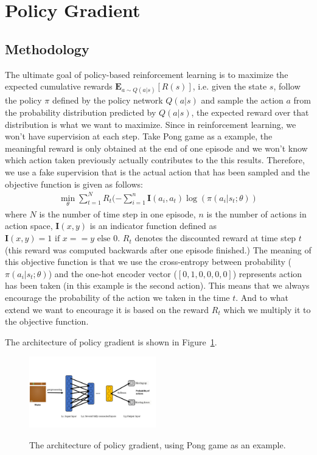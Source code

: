\section{Policy Gradient}
\subsection{Methodology}
The ultimate goal of policy-based reinforcement learning is to maximize the 
expected cumulative rewards $\textbf{E}_{a \sim Q(a|s)}[R(s)]$, i.e. given 
the state $s$, follow the policy $\pi$ defined by the policy network $Q(a|s)$ and
sample the action $a$ from the probability distribution predicted by $Q(a|s)$, the 
expected reward over that distribution is what we want to maximize. Since in 
reinforcement learning, we won't have supervision at each step. Take Pong game 
as a example, the meaningful reward is only obtained at the end of one episode
and we won't know which action taken previously actually contributes to the 
this results. Therefore, we use a fake supervision that is the actual action 
that has been sampled and the objective function is given as follows:
\begin{equation*}
\begin{split}
\min_{\theta}\sum_{t=1}^N R_t (-\sum_{i=1}^{n}\textbf{I}(a_i, a_t)\log(\pi(a_i|s_t; \theta))
\end{split}
\end{equation*}
where $N$ is the number of time step in one episode, $n$ is the number of actions
in action space, $\textbf{I}(x, y)$ is an indicator function defined as $\textbf{I}(x, y) = 1 \text{ if } x==y \text{ else } 0$.
$R_t$ denotes the discounted reward at time step $t$ (this reward was computed backwards after one episode finished.)
The meaning of this objective function is that we use the cross-entropy between 
probability ($\pi(a_i|s_t; \theta)$) and the one-hot encoder vector ($[0,1,0,0,0,0]$) represents action has been taken
(in this example is the second action). This means that we always encourage the probability of the action 
we taken in the time $t$. And to what extend we want to encourage it is based on the reward $R_t$ which we 
multiply it to the objective function. 


The architecture of policy gradient is shown in Figure~\ref{fig:pg_picture}.

\begin{figure}[h!]
\centering
\includegraphics[width=0.49\textwidth]{./fig/policygradient.pdf} \\
\caption{The architecture of policy gradient, using Pong game as an example.}
\label{fig:pg_picture}
\end{figure}


